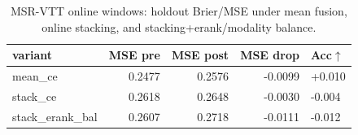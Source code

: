 \begin{table}[t]\centering
\caption{MSR-VTT online windows: holdout Brier/MSE under mean fusion, online stacking, and stacking+erank/modality balance.}
\label{tab:agod-online-stack-mse}
\begin{tabular}{lrrr}\toprule
variant & MSE pre & MSE post & MSE drop & Acc$\uparrow$ \\
\midrule
mean\_ce & 0.2477 & 0.2576 & -0.0099 & +0.010 \\
stack\_ce & 0.2618 & 0.2648 & -0.0030 & -0.004 \\
stack\_erank\_bal & 0.2607 & 0.2718 & -0.0111 & -0.012 \\
\bottomrule
\end{tabular}
\end{table}
